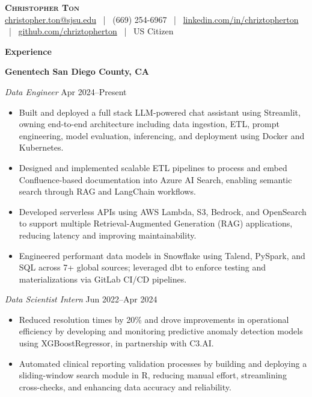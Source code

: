 \documentclass[letterpaper,11pt]{article}
\newcommand{\resumesection}[1]{
  \vspace{8pt}
  \noindent\textbf{\Large #1} \\
  \vspace{2pt}
}
\begin{document}
\begin{center}
    \textbf{\Huge \scshape Christopher Ton} \\
    \href{mailto:christopher.ton@sjsu.edu}{christopher.ton@sjsu.edu} ~|~ (669) 254-6967 ~|~ \href{https://linkedin.com/in/chriztopherton/}{linkedin.com/in/chriztopherton} ~|~ \href{https://github.com/chriztopherton}{github.com/chriztopherton} ~|~ US Citizen
\end{center}

\resumesection{Experience}

\textbf{Genentech \hfill San Diego County, CA}\par
\textit{Data Engineer} \hfill Apr 2024--Present
\begin{itemize}[leftmargin=0.15in, itemsep=1pt, parsep=0pt]
    \item Built and deployed a full stack LLM-powered chat assistant using Streamlit, owning end-to-end architecture including data ingestion, ETL, prompt engineering, model evaluation, inferencing, and deployment using Docker and Kubernetes.
    \item Designed and implemented scalable ETL pipelines to process and embed Confluence-based documentation into Azure AI Search, enabling semantic search through RAG and LangChain workflows.
    \item Developed serverless APIs using AWS Lambda, S3, Bedrock, and OpenSearch to support multiple Retrieval-Augmented Generation (RAG) applications, reducing latency and improving maintainability.
    \item Engineered performant data models in Snowflake using Talend, PySpark, and SQL across 7+ global sources; leveraged dbt to enforce testing and materializations via GitLab CI/CD pipelines.
\end{itemize}

\textit{Data Scientist Intern} \hfill Jun 2022--Apr 2024
\begin{itemize}[leftmargin=0.15in, itemsep=1pt, parsep=0pt]
    \item Reduced resolution times by 20\% and drove improvements in operational efficiency by developing and monitoring predictive anomaly detection models using XGBoostRegressor, in partnership with C3.AI.
    \item Automated clinical reporting validation processes by building and deploying a sliding-window search module in R, reducing manual effort, streamlining cross-checks, and enhancing data accuracy and reliability.
\end{itemize}
\end{document}

